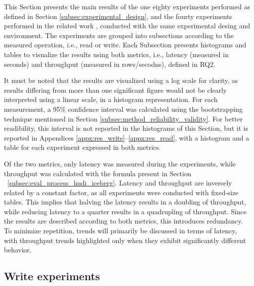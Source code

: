 
This Section presents the main results of the one eighty experiments performed as defined in Section \ref{subsec:experimental_design}, and the fourty experiments performed in the related work \cite{manfrediReducingReadWrite2024}, conducted with the same experimental desing and environment. The experiments are grouped into subsections according to the measured operation, i.e., read or write. Each Subsection presents histograms and tables to visualize the results using both metrics, i.e., latency (measured in seconds) and throughput (measured in rows/secodns), defined in \gls{RQ}2.

It must be noted that the results are visualized using a log scale for clarity, as results differing from more than one significant figure would not be clearly interpreted using a linear scale, in a histogram representation. For each measurement, a 95\% confidence interval was calculated using the bootstrapping technique mentioned in Section \ref{subsec:method_reliability_validity}. For better readibility, this interval is not reported in the histograms of this Section, but it is reported in Appendices \ref{appx:res_write}--\ref{appx:res_read}, with a histogram and a table for each experiment expressed in both metrics.

Of the two metrics, only latency was measured during the experiments, while throughput was calculated with the formula present in Section ~\ref{subsec:eval_process_hudi_iceberg}. Latency and throughput are inversely related by a constant factor, as all experiments were conducted with fixed-size tables. This implies that halving the latency results in a doubling of throughput, while reducing latency to a quarter results in a quadrupling of throughput. Since the results are described according to both metrics, this introduces redundancy. To minimize repetition, trends will primarily be discussed in terms of latency, with throughput trends highlighted only when they exhibit significantly different behavior.



\subsection{Write experiments}

